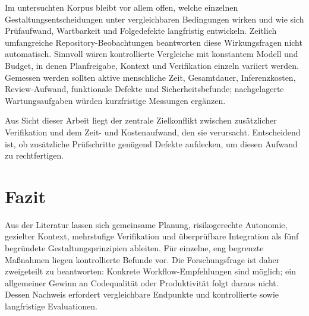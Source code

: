 \documentclass[conference]{IEEEtran}
\begin{document}
Im untersuchten Korpus bleibt vor allem offen, welche einzelnen Gestaltungsentscheidungen unter vergleichbaren Bedingungen wirken und wie sich Prüfaufwand, Wartbarkeit und Folgedefekte langfristig entwickeln. Zeitlich umfangreiche Repository-Beobachtungen beantworten diese Wirkungsfragen nicht automatisch. Sinnvoll wären kontrollierte Vergleiche mit konstantem Modell und Budget, in denen Planfreigabe, Kontext und Verifikation einzeln variiert werden. Gemessen werden sollten aktive menschliche Zeit, Gesamtdauer, Inferenzkosten, Review-Aufwand, funktionale Defekte und Sicherheitsbefunde; nachgelagerte Wartungsaufgaben würden kurzfristige Messungen ergänzen.

Aus Sicht dieser Arbeit liegt der zentrale Zielkonflikt zwischen zusätzlicher Verifikation und dem Zeit- und Kostenaufwand, den sie verursacht. Entscheidend ist, ob zusätzliche Prüfschritte genügend Defekte aufdecken, um diesen Aufwand zu rechtfertigen.

\section{Fazit}
Aus der Literatur lassen sich gemeinsame Planung, risikogerechte Autonomie, gezielter Kontext, mehrstufige Verifikation und überprüfbare Integration als fünf begründete Gestaltungsprinzipien ableiten. Für einzelne, eng begrenzte Maßnahmen liegen kontrollierte Befunde vor. Die Forschungsfrage ist daher zweigeteilt zu beantworten: Konkrete Workflow-Empfehlungen sind möglich; ein allgemeiner Gewinn an Codequalität oder Produktivität folgt daraus nicht. Dessen Nachweis erfordert vergleichbare Endpunkte und kontrollierte sowie langfristige Evaluationen.
\end{document}
